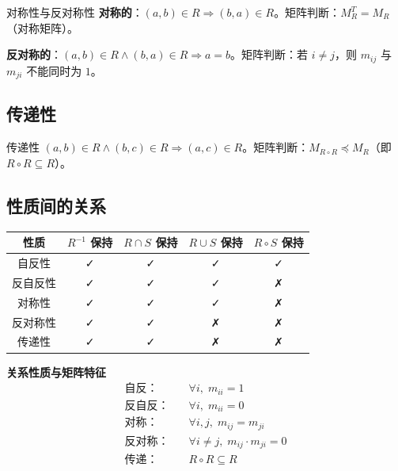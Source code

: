 \begin{mydefinition}{对称性与反对称性}
\textbf{对称的}：$(a,b) \in R \Rightarrow (b,a) \in R$。矩阵判断：$M_R^T = M_R$（对称矩阵）。

\textbf{反对称的}：$(a,b) \in R \land (b,a) \in R \Rightarrow a = b$。矩阵判断：若 $i \neq j$，则 $m_{ij}$ 与 $m_{ji}$ 不能同时为 $1$。
\end{mydefinition}

\subsection{传递性}

\begin{mydefinition}{传递性}
$(a,b) \in R \land (b,c) \in R \Rightarrow (a,c) \in R$。矩阵判断：$M_{R \circ R} \preceq M_R$（即 $R \circ R \subseteq R$）。
\end{mydefinition}

\subsection{性质间的关系}

\begin{center}
\begin{tabular}{c|c|c|c|c}
\toprule
性质 & $R^{-1}$ 保持 & $R \cap S$ 保持 & $R \cup S$ 保持 & $R \circ S$ 保持 \\
\midrule
自反性 & ✓ & ✓ & ✓ & ✓ \\
反自反性 & ✓ & ✓ & ✓ & ✗ \\
对称性 & ✓ & ✓ & ✓ & ✗ \\
反对称性 & ✓ & ✓ & ✗ & ✗ \\
传递性 & ✓ & ✓ & ✗ & ✗ \\
\bottomrule
\end{tabular}
\end{center}

\begin{myformula}
\textbf{关系性质与矩阵特征}
\[
\begin{aligned}
\text{自反：}&\quad \forall i,\; m_{ii}=1 \\
\text{反自反：}&\quad \forall i,\; m_{ii}=0 \\
\text{对称：}&\quad \forall i,j,\; m_{ij}=m_{ji} \\
\text{反对称：}&\quad \forall i \neq j,\; m_{ij} \cdot m_{ji}=0 \\
\text{传递：}&\quad R \circ R \subseteq R
\end{aligned}
\]
\end{myformula}

